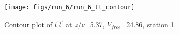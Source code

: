 \begin{figure}[H]
\centering
\texttt{[image: figs/run\_6/run\_6\_tt\_contour]}
\caption{Contour plot of $\overline{t^\prime t^\prime}$ at $z/c$=5.37, $V_{free}$=24.86, station 1.}
\label{fig:run_6_tt_contour}
\end{figure}


